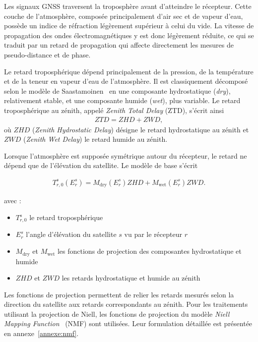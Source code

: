 Les signaux GNSS traversent la troposphère avant d'atteindre le récepteur.
Cette couche de l'atmosphère, composée principalement d'air sec et de vapeur
d'eau, possède un indice de réfraction légèrement supérieur à celui du vide.
La vitesse de propagation des ondes électromagnétiques y est donc légèrement
réduite, ce qui se traduit par un retard de propagation qui affecte directement
les mesures de pseudo-distance et de phase.

Le retard troposphérique dépend principalement de la pression, de la
température et de la teneur en vapeur d'eau de l'atmosphère. Il est
classiquement décomposé selon le modèle de Saastamoinen~\cite{saastamoinen1972} en une composante hydrostatique (\textit{dry}),
relativement stable, et une composante humide (\textit{wet}), plus variable.
Le retard troposphérique au zénith, appelé \textit{Zenith Total Delay} (ZTD),
s'écrit ainsi
\begin{align}
ZTD = ZHD + ZWD,
\label{eq:ztd_decomposition}
\end{align}
où $ZHD$ (\textit{Zenith Hydrostatic Delay}) désigne le retard hydrostatique
au zénith et $ZWD$ (\textit{Zenith Wet Delay}) le retard humide au zénith.

Lorsque l'atmosphère est supposée symétrique autour du récepteur, le retard ne
dépend que de l'élévation du satellite. Le modèle de base s'écrit

\begin{align}
T_{r,0}^s(E_r^s)
=
M_{\mathrm{dry}}(E_r^s)ZHD
+
M_{\mathrm{wet}}(E_r^s)ZWD.
\label{eq:tropo_no_grad}
\end{align}

avec :

\begin{itemize}
    \item $T_{r,0}^s$ le retard troposphérique 
    \item $E_r^s$ l'angle d'élévation du satellite $s$ vu par le récepteur
    $r$ 
    \item $M_{\mathrm{dry}}$ et $M_{\mathrm{wet}}$ les fonctions de projection
    des composantes hydrostatique et humide 
    \item $ZHD$ et $ZWD$ les retards hydrostatique et humide au zénith
\end{itemize}

Les fonctions de projection permettent de relier les retards mesurés selon
la direction du satellite aux retards correspondants au zénith. Pour les traitements utilisant la projection de Niell, les fonctions de projection du modèle \textit{Niell Mapping Function}~\cite{niell1996}
(NMF) sont utilisées. Leur formulation détaillée est présentée en
annexe~\ref{annexe:nmf}.

